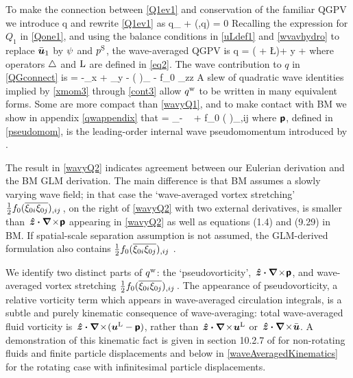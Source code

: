 \documentclass[12pt, oneside]{book}
\begin{document}
To make the connection between \eqref{Q1ev1} and conservation of the familiar QGPV we introduce
\beq
q  {}\com 
\eeq
and rewrite \eqref{Q1ev1} as
\beq
q_{\bt} + \sJ\big(\psiL,q\big) = 0 \per
\label{QGlike}
\eeq
 Recalling the expression for $Q_1$ in \eqref{Qone1}, and using the balance conditions in \eqref{uLdef1} and \eqref{wvavhydro} to replace $\bar {\boldsymbol u}_1$ by $\psi$ and $p^{\mathrm{S}}$, the wave-averaged  QGPV  is
\beq
q = \left( \hlap + \L  \right)\psiL + \beta y + \qdag\com
\label{QGconnect}
\eeq
where operators $\triangle$ and $\mathrm{L}$ are defined in \eqref{eq2}.  The wave contribution to $q$ in \eqref{QGconnect} is
\beq
\qdag =   -\vS_x + \uS_y - \left (  \right )_{\dz} - f_0 \Lambda_{zz}  \per
\label{wavyQ1}
\eeq
A slew of quadratic wave identities implied by \eqref{xmom3} through \eqref{cont3} allow $q^{\mathrm{w}}$ to be written in many equivalent forms.  Some are more compact than \eqref{wavyQ1}, and to make contact with BM we show in appendix \ref{qwappendix} that
 \beq
\qdag = _{-\bzh \,\bcdot \, \curl \,  \sbp} \; + \; \half f_0 \left ( \right )_{,ij}\com
\label{wavyQ2}
\eeq
where $\boldsymbol{\mathsf{p}}$, defined in \eqref{pseudomom}, is the leading-order internal wave pseudomomentum introduced by \cite{AndrewsMcIntyre}. 

The result in \eqref{wavyQ2} indicates agreement between our Eulerian derivation and the BM GLM derivation.  The main difference is that BM assumes a slowly varying wave field; in that case the `wave-averaged vortex stretching' $\tfrac{1}{2} f_0  (\overline{\xi_{0i} \xi_{0j}}  )_{,ij} \, $, on the right of \eqref{wavyQ2} with two external derivatives, is smaller than $\hspace{0.1em}\boldsymbol{\hat z} \boldsymbol \cdot \boldsymbol \nabla \!\times\! \boldsymbol{\mathsf{p}}$ appearing in \eqref{wavyQ2} as well as equations (1.4) and (9.29) in BM.  If spatial-scale separation assumption is not assumed, the GLM-derived formulation also contains $\tfrac{1}{2} f_0  (\overline{\xi_{0i} \xi_{0j}}  )_{,ij}$ \citep{Holmes2011}.  

We identify two distinct parts of $q^{\mathrm{w}}$: the `pseudovorticity', $\hspace{0.1em}\boldsymbol{\hat z} \boldsymbol \cdot \boldsymbol \nabla \!\times\! \boldsymbol{\mathsf{p}}$, and wave-averaged vortex stretching $\tfrac{1}{2} f_0  (\overline{\xi_{0i} \xi_{0j}}  )_{,ij} \, $.  The appearance of pseudovorticity, a relative vorticity term which appears in wave-averaged circulation integrals, is a subtle and purely kinematic consequence of wave-averaging: total wave-averaged fluid vorticity is $\hspace{0.1em}\boldsymbol{\hat z} \boldsymbol \cdot \boldsymbol \nabla \!\times\!(\boldsymbol{u}^{\mathrm{L}} - \boldsymbol{\mathsf{p}})$, rather than $\hspace{0.1em}\boldsymbol{\hat z} \boldsymbol \cdot \boldsymbol \nabla \!\times\! \boldsymbol{u}^{\mathrm{L}}$ or $\hspace{0.1em}\boldsymbol{\hat z} \boldsymbol \cdot \boldsymbol \nabla \!\times\! \bar{\boldsymbol u}$.  A demonstration of this kinematic fact is given in section 10.2.7 of \cite{Buhler} for non-rotating fluids and finite particle displacements and below in \ch \ref{waveAveragedKinematics} for the rotating case with infinitesimal particle displacements. 
\end{document}
